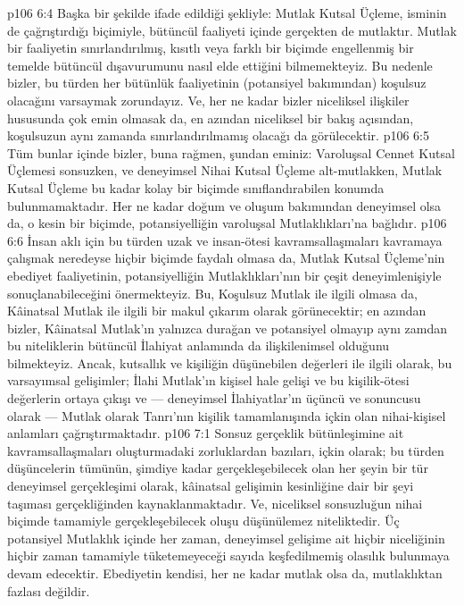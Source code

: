 \vs p106 6:4 Başka bir şekilde ifade edildiği şekliyle: Mutlak Kutsal Üçleme, isminin de çağrıştırdığı biçimiyle, bütüncül faaliyeti içinde gerçekten de mutlaktır. Mutlak bir faaliyetin sınırlandırılmış, kısıtlı veya farklı bir biçimde engellenmiş bir temelde bütüncül dışavurumunu nasıl elde ettiğini bilmemekteyiz. Bu nedenle bizler, bu türden her bütünlük faaliyetinin (potansiyel bakımından) koşulsuz olacağını varsaymak zorundayız. Ve, her ne kadar bizler niceliksel ilişkiler hususunda çok emin olmasak da, en azından niceliksel bir bakış açısından, koşulsuzun aynı zamanda sınırlandırılmamış olacağı da görülecektir.
\vs p106 6:5 Tüm bunlar içinde bizler, buna rağmen, şundan eminiz: Varoluşsal Cennet Kutsal Üçlemesi sonsuzken, ve deneyimsel Nihai Kutsal Üçleme alt\hyp{}mutlakken, Mutlak Kutsal Üçleme bu kadar kolay bir biçimde sınıflandırabilen konumda bulunmamaktadır. Her ne kadar doğum ve oluşum bakımından deneyimsel olsa da, o kesin bir biçimde, potansiyelliğin varoluşsal Mutlaklıkları’na bağlıdır.
\vs p106 6:6 İnsan aklı için bu türden uzak ve insan\hyp{}ötesi kavramsallaşmaları kavramaya çalışmak neredeyse hiçbir biçimde faydalı olmasa da, Mutlak Kutsal Üçleme’nin ebediyet faaliyetinin, potansiyelliğin Mutlaklıkları’nın bir çeşit deneyimlenişiyle sonuçlanabileceğini önermekteyiz. Bu, Koşulsuz Mutlak ile ilgili olmasa da, Kâinatsal Mutlak ile ilgili bir makul çıkarım olarak görünecektir; en azından bizler, Kâinatsal Mutlak’ın yalnızca durağan ve potansiyel olmayıp aynı zamdan bu niteliklerin bütüncül İlahiyat anlamında da ilişkilenimsel olduğunu bilmekteyiz. Ancak, kutsallık ve kişiliğin düşünebilen değerleri ile ilgili olarak, bu varsayımsal gelişimler; İlahi Mutlak’ın kişisel hale gelişi ve bu kişilik\hyp{}ötesi değerlerin ortaya çıkışı ve --- deneyimsel İlahiyatlar’ın üçüncü ve sonuncusu olarak --- Mutlak olarak Tanrı’nın kişilik tamamlanışında içkin olan nihai\hyp{}kişisel anlamları çağrıştırmaktadır.
\vs p106 7:1 Sonsuz gerçeklik bütünleşimine ait kavramsallaşmaları oluşturmadaki zorluklardan bazıları, içkin olarak; bu türden düşüncelerin tümünün, şimdiye kadar gerçekleşebilecek olan her şeyin bir tür deneyimsel gerçekleşimi olarak, kâinatsal gelişimin kesinliğine dair bir şeyi taşıması gerçekliğinden kaynaklanmaktadır. Ve, niceliksel sonsuzluğun nihai biçimde tamamiyle gerçekleşebilecek oluşu düşünülemez niteliktedir. Üç potansiyel Mutlaklık içinde her zaman, deneyimsel gelişime ait hiçbir niceliğinin hiçbir zaman tamamiyle tüketemeyeceği sayıda keşfedilmemiş olasılık bulunmaya devam edecektir. Ebediyetin kendisi, her ne kadar mutlak olsa da, mutlaklıktan fazlası değildir.
